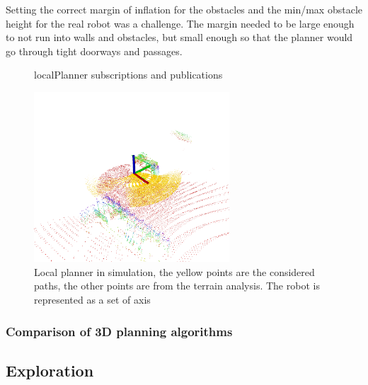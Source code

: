 \documentclass[11pt]{article}
\begin{document}
        Setting the correct margin of inflation for the obstacles and the min/max obstacle height for the real robot was a challenge. The margin needed to be large enough to not run into walls and obstacles, but small enough so that the planner would go through tight doorways and passages. 

        
        \begin{figure}[h]
            \centering
            \resizebox{0.6\textwidth}{!}{%
            
            }   
            \caption{localPlanner subscriptions and publications}
            \label{fig:local_planner}
        \end{figure}
        
        \begin{figure}[h!]
            \centering
            \includegraphics[width=0.65\textwidth]{Images/localPlannerSimCropped.png}
            \caption{Local planner in simulation, the yellow points are the considered paths, the other points are from the terrain analysis. The robot is represented as a set of axis}
            \label{fig:local_planner_sim}
        \end{figure}
        
        
        
        \subsubsection{Comparison of 3D planning algorithms}

        

    \subsection{Exploration}
\end{document}

